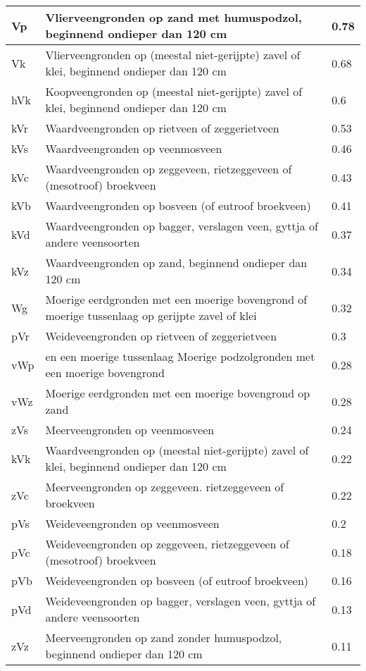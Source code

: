 {\begin{appendices}
\begin{center}
\begin{longtable}{|l| p{11cm} | l |}
Vp & Vlierveengronden op zand met humuspodzol, beginnend ondieper dan 120 cm  & 0.78 \\ \hline
Vk & Vlierveengronden op (meestal niet-gerijpte) zavel of klei, beginnend ondieper dan 120 cm  & 0.68 \\ \hline
hVk & Koopveengronden op (meestal niet-gerijpte) zavel of klei, beginnend ondieper dan 120 cm  & 0.6 \\ \hline
kVr & Waardveengronden op rietveen of zeggerietveen  & 0.53 \\ \hline
kVs & Waardveengronden op veenmosveen  & 0.46 \\ \hline
kVc & Waardveengronden op zeggeveen, rietzeggeveen of (mesotroof) broekveen  & 0.43 \\ \hline
kVb & Waardveengronden op bosveen (of eutroof broekveen) & 0.41 \\ \hline
kVd & Waardveengronden op bagger, verslagen veen, gyttja of andere veensoorten  & 0.37 \\ \hline
kVz & Waardveengronden op zand, beginnend ondieper dan 120 cm  & 0.34 \\ \hline
Wg & Moerige eerdgronden met een moerige bovengrond of  moerige tussenlaag op gerijpte zavel of klei  & 0.32 \\ \hline
pVr & Weideveengronden op rietveen of zeggerietveen  & 0.3 \\ \hline
vWp & en een moerige tussenlaag Moerige podzolgronden met een moerige bovengrond  & 0.28 \\ \hline
vWz & Moerige eerdgronden met een moerige bovengrond op zand  & 0.28 \\ \hline
zVs & Meerveengronden op veenmosveen  & 0.24 \\ \hline
kVk & Waardveengronden op (meestal niet-gerijpte) zavel of klei, beginnend ondieper dan 120 cm  & 0.22 \\ \hline
zVc & Meerveengronden op zeggeveen. rietzeggeveen of broekveen  & 0.22 \\ \hline
pVs & Weideveengronden op veenmosveen  & 0.2 \\ \hline
pVc & Weideveengronden op zeggeveen, rietzeggeveen of (mesotroof) broekveen  & 0.18 \\ \hline
pVb & Weideveengronden op bosveen (of eutroof broekveen)  & 0.16 \\ \hline
pVd & Weideveengronden op bagger, verslagen veen, gyttja of andere veensoorten & 0.13 \\ \hline
zVz & Meerveengronden op zand zonder humuspodzol, beginnend ondieper dan 120 cm & 0.11 \\ \hline

\end{longtable}
\end{center}
\end{appendices}}
